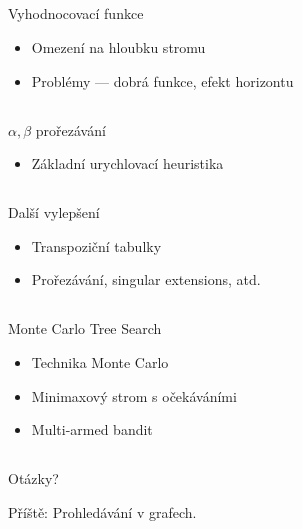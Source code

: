 \documentclass{beamer}
\begin{document}
\subsection{}
\begin{frame}{Vyhodnocovací funkce}
\begin{itemize}
\item Omezení na hloubku stromu
\item Problémy --- dobrá funkce, efekt horizontu
\end{itemize}
\end{frame}

\subsection{}
\begin{frame}{$\alpha,\beta$ prořezávání}
\begin{itemize}
\item Základní urychlovací heuristika
\end{itemize}
\end{frame}

\subsection{}
\begin{frame}{Další vylepšení}
\begin{itemize}
\item Transpoziční tabulky
\item Prořezávání, singular extensions, atd.
\end{itemize}
\end{frame}

\subsection{}
\begin{frame}{Monte Carlo Tree Search}
\begin{itemize}
\item Technika Monte Carlo
\item Minimaxový strom s očekáváními
\item Multi-armed bandit
\end{itemize}
\end{frame}

\subsection{}
\begin{frame}{Otázky?}
\begin{center}
Příště: Prohledávání v grafech.
\end{center}
\end{frame}
\end{document}
